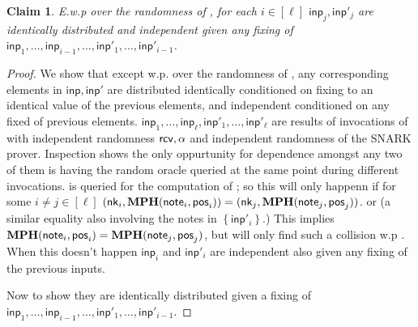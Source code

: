 \documentclass[11pt]{article}
\numberwithin{equation}{section} %
\numberwithin{figure}{section} %
\newtheorem{claim}[thm]{Claim}
\newcommand{\inp}{\ensuremath{\mathsf{inp}}\xspace}
\newcommand{\set}[1]{\ensuremath{\left\{#1\right\}}\xspace}
\begin{document}
\begin{claim}\label{clm:inps-areind}
E.w.p \negl over the randomness of \adv, for each $i\in [\ell]$ $\inp_j,\inp'_j$ are identically distributed and independent given any fixing of $\inp_1,\ldots,\inp_{i-1},\ldots,\inp'_1,\ldots,\inp'_{i-1}$. 

\end{claim}																	
\begin{proof}
We show that except w.p. \negl over the randomness of \adv, any corresponding elements in $\inp,\inp'$ are distributed identically conditioned on fixing to an identical value of the previous elements, and independent conditioned on any fixed of previous elements.
$\inp_1,\ldots,\inp_\ell,\inp'_1,\ldots,\inp'_\ell$
are results of invocations of \makeinput with independent randomness
$\mathsf{rcv},\alpha$ and independent randomness of the SNARK prover.
Inspection shows the only oppurtunity for dependence amongst any two of them is having 
the random oracle  \RO queried at the same point during different invocations.
\RO is queried for the computation of \NF; so this will only happenn if for some $i\neq j\in [\ell]$ 
 $(\mathsf{nk}_i,\mathbf{MPH}(\mathsf{note}_i,\mathsf{pos}_i)) =(\mathsf{nk}_j,\mathbf{MPH}(\mathsf{note}_j,\mathsf{pos}_j))$.
or 
(a similar equality also involving the notes in $\set{\inp'_i}$.)
This implies $\mathbf{MPH}(\mathsf{note}_i,\mathsf{pos}_i) = \mathbf{MPH}(\mathsf{note}_j,\mathsf{pos}_j)$,
but \adv will only find such a collision w.p \negl.
When this doesn't happen $\inp_i$ and $\inp'_i$ are independent also given any fixing of the previous inputs.


Now to show they are identically distributed given a fixing of $\inp_1,\ldots,\inp_{i-1},\ldots,\inp'_1,\ldots,\inp'_{i-1}$.


\end{proof}
\end{document}
